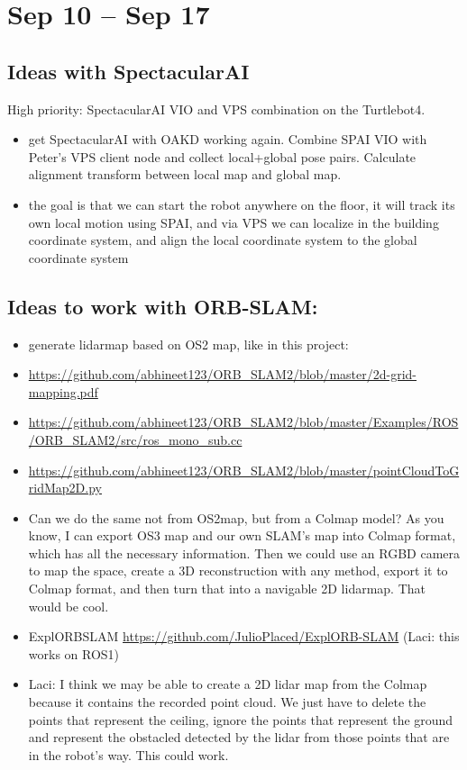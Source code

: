 \documentclass{article}
\begin{document}
\section{Sep 10 -- Sep 17}
\subsection{Ideas with SpectacularAI}
High priority: SpectacularAI VIO and VPS combination on the Turtlebot4.
\begin{itemize}
\item get SpectacularAI with OAKD working again. Combine SPAI VIO with Peter's VPS client node and collect local+global pose pairs. Calculate alignment transform between local map and global map.
\item the goal is that we can start the robot anywhere on the floor, it will track its own local motion using SPAI, and via VPS we can localize in the building coordinate system, and align the local coordinate system to the global coordinate system
\end{itemize}

\subsection{Ideas to work with ORB-SLAM:}
\begin{itemize}
    
\item generate lidarmap based on OS2 map, like in this project:
\item \url{https://github.com/abhineet123/ORB_SLAM2/blob/master/2d-grid-mapping.pdf}
\item \url{https://github.com/abhineet123/ORB_SLAM2/blob/master/Examples/ROS/ORB_SLAM2/src/ros_mono_sub.cc}
\item \url{https://github.com/abhineet123/ORB_SLAM2/blob/master/pointCloudToGridMap2D.py}

\item Can we do the same not from OS2map, but from a Colmap model? As you know, I can export OS3 map and our own SLAM's map into Colmap format, which has all the necessary information. Then we could use an RGBD camera to map the space, create a 3D reconstruction with any method, export it to Colmap format, and then turn that into a navigable 2D lidarmap. That would be cool.

\item ExplORBSLAM \url{https://github.com/JulioPlaced/ExplORB-SLAM} (Laci: this works on ROS1)

\item Laci: I think we may be able to create a 2D lidar map from the Colmap because it contains the recorded point cloud. We just have to delete the points that represent the ceiling, ignore the points that represent the ground and represent the obstacled detected by the lidar from those points that are in the robot's way. This could work.

\end{itemize}
\end{document}

